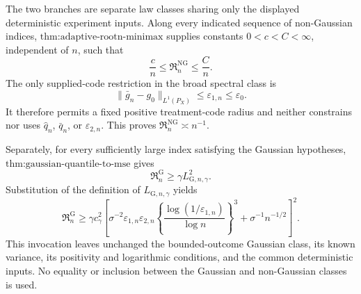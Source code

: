 The two branches are separate law classes sharing only the displayed deterministic experiment inputs.  Along every indicated sequence of non-Gaussian indices, \(\text{thm:adaptive-rootn-minimax}\) supplies constants \(0<c<C<\infty\), independent of \(n\), such that
\[
 \frac cn\le\mathfrak R_n^{\mathrm{NG}}\le\frac Cn.
\]
The only supplied-code restriction in the broad spectral class is
\[
 \lVert\bar g_n-g_0\rVert_{L^1(P_X)}
 \le\varepsilon_{1,n}\le\varepsilon_0.
\]
It therefore permits a fixed positive treatment-code radius and neither constrains nor uses \(\widehat q_n\), \(\bar q_n\), or \(\varepsilon_{2,n}\).  This proves \(\mathfrak R_n^{\mathrm{NG}}\asymp n^{-1}\).

Separately, for every sufficiently large index satisfying the Gaussian hypotheses, \(\text{thm:gaussian-quantile-to-mse}\) gives
\[
 \mathfrak R_n^{\mathrm G}\ge\gamma L_{\mathrm G,n,\gamma}^2.
\]
Substitution of the definition of \(L_{\mathrm G,n,\gamma}\) yields
\[
 \mathfrak R_n^{\mathrm G}
 \ge\gamma c_\gamma^2
 \left[
  \sigma^{-2}\varepsilon_{1,n}\varepsilon_{2,n}
  \left\{\frac{\log(1/\varepsilon_{1,n})}{\log n}\right\}^3
  +\sigma^{-1}n^{-1/2}
 \right]^2.
\]
This invocation leaves unchanged the bounded-outcome Gaussian class, its known variance, its positivity and logarithmic conditions, and the common deterministic inputs.  No equality or inclusion between the Gaussian and non-Gaussian classes is used.